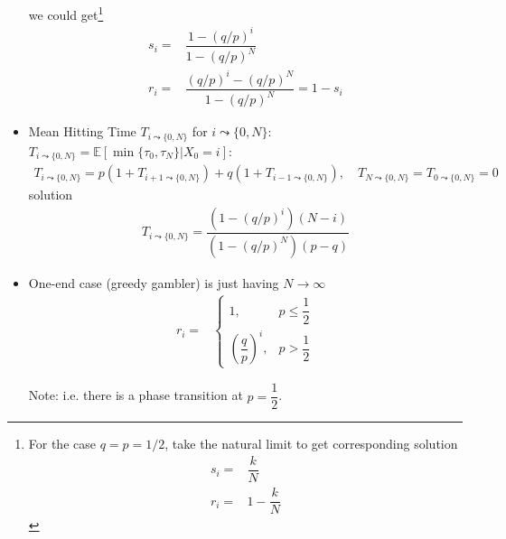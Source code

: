 \begin{itemize}[topsep=2pt,itemsep=0pt]
    we could get\footnote{For the case $ q=p=1/2 $, take the natural limit to get corresponding solution
    \begin{align}
        s_i=&\dfrac{k}{N}\\
        r_i=&1-\dfrac{k}{N}
    \end{align}
    }
    \begin{align}
        s_i=&\dfrac{1-(q/p)^i}{1-(q/p)^N}\\
        r_i=&\dfrac{(q/p)^i-(q/p)^N}{1-(q/p)^N}=1-s_i
    \end{align}
    \item Mean Hitting Time $ T_{i\leadsto \{0,N\}} $ for $ i\leadsto \{0,N\} $: $ T_{i\leadsto \{0,N\}}=\mathbb{E}\left[ \min\{\tau_{0},\tau_{N}\}|X_0=i \right]  $:
    \begin{align}
        T_{i\leadsto \{0,N\}}= p\left(1+T_{i+1\leadsto \{0,N\}}\right) + q\left(1+T_{i-1\leadsto \{0,N\}}\right),\quad T_{N\leadsto \{0,N\}}=T_{0\leadsto \{0,N\}}=0
    \end{align}
    solution
\begin{align}
    T_{i\leadsto\{0,N\}}=\dfrac{\left(1-(q/p)^i\right)(N-i)}{\left(1-(q/p)^N\right)(p-q)} 
\end{align}
    \item One-end case (greedy gambler) is just having $ N\to\infty $
    \begin{align}
        r_i=&\begin{cases}
            1,&p\leq \dfrac{1}{2}\\
            \left(\dfrac{q}{p}\right)^i,&p>\dfrac{1}{2}
        \end{cases} 
    \end{align}
    
    Note: i.e. there is a phase transition at $ p=\dfrac{1}{2} $.

\end{itemize}







